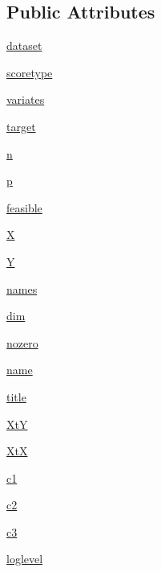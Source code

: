\subsection*{Public Attributes}
\begin{CompactItemize}
\item 
\hyperlink{classgen_1_1binary__post__old_7f01b2229bc5804e960a1dc77bc6f846}{dataset}
\item 
\hyperlink{classgen_1_1binary__post__old_5293c3847ad6c37030d24d41b4a4eab2}{scoretype}
\item 
\hyperlink{classgen_1_1binary__post__old_2587b7ffadd5f860d7a3ab12756e95f3}{variates}
\item 
\hyperlink{classgen_1_1binary__post__old_9538d9a27640ca3c4f4a850f846f0d31}{target}
\item 
\hyperlink{classgen_1_1binary__post__old_216afb9d00f9463d7a5a903a40d20bf4}{n}
\item 
\hyperlink{classgen_1_1binary__post__old_926ce6ac7ef52ea4771dc948c1194b97}{p}
\item 
\hyperlink{classgen_1_1binary__post__old_3b3a31af2ddcba10547123ed91fc9d1f}{feasible}
\item 
\hyperlink{classgen_1_1binary__post__old_a2da390b89edbeba2f85014b6a2ac3ac}{X}
\item 
\hyperlink{classgen_1_1binary__post__old_2cf316c3b6750ee8f1a76bbda529e948}{Y}
\item 
\hyperlink{classgen_1_1binary__post__old_0c4ed9122532713d86b1c9f07c23ec2e}{names}
\item 
\hyperlink{classgen_1_1binary__post__old_80491b8bc4038ad90f318e951b7a09e9}{dim}
\item 
\hyperlink{classgen_1_1binary__post__old_1117a52fa6957e208fd5fcfd240e3fdb}{nozero}
\item 
\hyperlink{classgen_1_1binary__post__old_ba64762a3d525a8fc7d6722d8f0b3d79}{name}
\item 
\hyperlink{classgen_1_1binary__post__old_7e161b92c592af29da87881171431060}{title}
\item 
\hyperlink{classgen_1_1binary__post__old_de5ca8168e12417a339875aecde1b5e4}{XtY}
\item 
\hyperlink{classgen_1_1binary__post__old_e0c9510b59efacc1af2e8541ca814f59}{XtX}
\item 
\hyperlink{classgen_1_1binary__post__old_7adec8797994071a78edc8c5727336d3}{c1}
\item 
\hyperlink{classgen_1_1binary__post__old_10f35d33de2a393287d487c7a4362154}{c2}
\item 
\hyperlink{classgen_1_1binary__post__old_1cb800e469204fec167fc5429a228a2d}{c3}
\item 
\hyperlink{classgen_1_1binary__post__old_6510c634aa2f413c1a71e05be4b06de7}{loglevel}
\end{CompactItemize}
